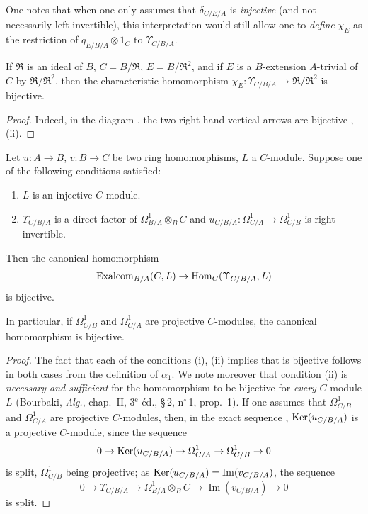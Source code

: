 One notes that when one only assumes that $\delta_{C/E/A}$ is \emph{injective} (and not necessarily left-invertible), this interpretation would still allow one to \emph{define} $\chi_E$ as the restriction of $q_{E/B/A}\otimes 1_C$ to $\Upsilon_{C/B/A}$.

\begin{corollary}[20.6.10]
\label{0.20.6.10}
If $\mathfrak{R}$ is an ideal of $B$, $C=B/\mathfrak{R}$, $E=B/\mathfrak{R}^2$, and if $E$ is a $B$-extension $A$-trivial  of $C$ by $\mathfrak{R}/\mathfrak{R}^2$, then the characteristic homomorphism $\chi_E:\Upsilon_{C/B/A}\to\mathfrak{R}/\mathfrak{R}^2$ is bijective.
\end{corollary}

\begin{proof}
Indeed, in the diagram , the two right-hand vertical arrows are bijective , (ii).
\end{proof}

\begin{theorem}[20.6.11]
\label{0.20.6.11}
Let $u:A\to B$, $v:B\to C$ be two ring homomorphisms, $L$ a $C$-module.
Suppose one of the following conditions satisfied:
\begin{enumerate}
  \item[\rm(i)] $L$ is an injective $C$-module.
  \item[\rm(ii)] $\Upsilon_{C/B/A}$ is a direct factor of $\Omega^1_{B/A}\otimes_B C$ and $u_{C/B/A}:\Omega^1_{C/A}\to\Omega^1_{C/B}$ is right-invertible.
\end{enumerate}
Then the canonical homomorphism 
\[
  \operatorname{Exalcom}_{B/A}(C,L)\to\operatorname{Hom}_C(\Upsilon_{C/B/A},L)
\]
is bijective.

In particular, if $\Omega^1_{C/B}$ and $\Omega^1_{C/A}$ are projective $C$-modules, the canonical homomorphism  is bijective.
\end{theorem}

\begin{proof}
The fact that each of the conditions (i), (ii) implies that  is bijective follows in both cases from the definition of $\alpha_1$.
We note moreover that condition (ii) is \emph{necessary and sufficient} for the homomorphism  to be bijective for \emph{every} $C$-module $L$ (Bourbaki, \emph{Alg.}, chap.~II, 3$^\text{e}$ \'{e}d., \S\,2, n$^\circ$\,1, prop.~1).
If one assumes that $\Omega^1_{C/B}$ and $\Omega^1_{C/A}$ are projective $C$-modules, then, in the exact sequence , $\operatorname{Ker}(u_{C/B/A})$ is a projective $C$-module, since the sequence
\[
  0\to\operatorname{Ker}(u_{C/B/A})\to\Omega^1_{C/A}\to\Omega^1_{C/B}\to 0
\]
is split, $\Omega^1_{C/B}$ being projective; as $\operatorname{Ker}(u_{C/B/A})=\operatorname{Im}(v_{C/B/A})$, the sequence
\[
  0\to\Upsilon_{C/B/A}\to\Omega^1_{B/A}\otimes_B C\to\operatorname{Im}(v_{C/B/A})\to 0
\]
is split.
\end{proof}


